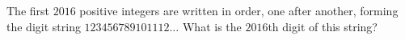 The first $2016$ positive integers are written in order, one after another, forming the digit string $123456789101112\ldots$ What is the $2016$th digit of this string?
